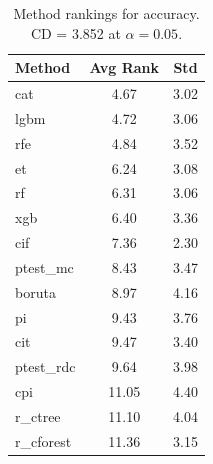 \begin{table}[h]
\centering
\caption{Method rankings for accuracy. CD = 3.852 at $\alpha=0.05$.}
\label{tab:ranks_accuracy}
\begin{tabular}{lcc}
\toprule
Method & Avg Rank & Std \\
\midrule
cat & 4.67 & 3.02 \\
lgbm & 4.72 & 3.06 \\
rfe & 4.84 & 3.52 \\
et & 6.24 & 3.08 \\
rf & 6.31 & 3.06 \\
xgb & 6.40 & 3.36 \\
cif & 7.36 & 2.30 \\
ptest_mc & 8.43 & 3.47 \\
boruta & 8.97 & 4.16 \\
pi & 9.43 & 3.76 \\
cit & 9.47 & 3.40 \\
ptest_rdc & 9.64 & 3.98 \\
cpi & 11.05 & 4.40 \\
r_ctree & 11.10 & 4.04 \\
r_cforest & 11.36 & 3.15 \\
\bottomrule
\end{tabular}
\end{table}